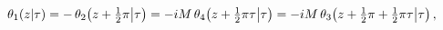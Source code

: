 \[\mathop{\theta_{1}\/}\nolimits\!\left(z\middle|\tau\right)=-\mathop{\theta_{2}%
\/}\nolimits\!\left(z+\tfrac{1}{2}\pi\middle|\tau\right)=-iM\mathop{\theta_{4}%
\/}\nolimits\!\left(z+\tfrac{1}{2}\pi\tau\middle|\tau\right)=-iM\mathop{\theta%
_{3}\/}\nolimits\!\left(z+\tfrac{1}{2}\pi+\tfrac{1}{2}\pi\tau\middle|\tau%
\right),\]